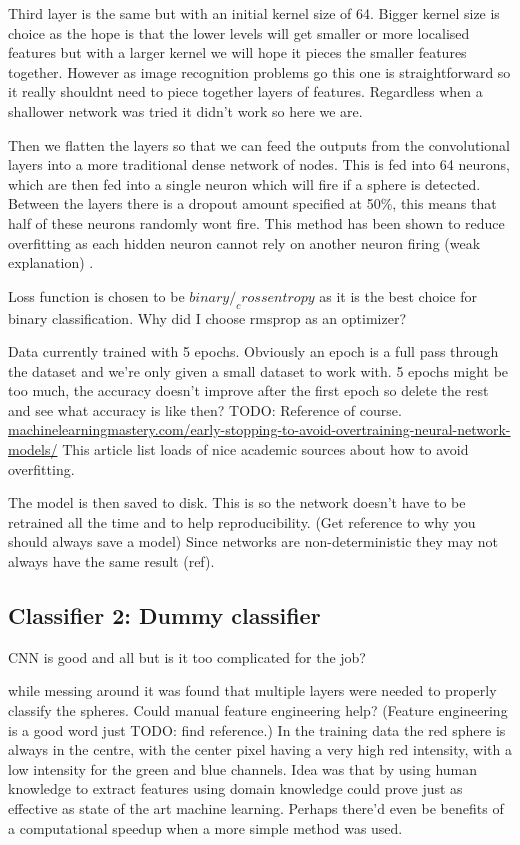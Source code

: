\documentclass{article}
\begin{document}
Third layer is the same but with an initial kernel size of 64.
Bigger kernel size is choice as the hope is that the lower levels will get smaller or more localised features but with a larger kernel we will hope it pieces the smaller features together.
However as image recognition problems go this one is straightforward so it really shouldnt need to piece together layers of features.
Regardless when a shallower network was tried it didn't work so here we are.  


Then we flatten the layers so that we can feed the outputs from the convolutional layers into a more traditional dense network of nodes.
This is fed into 64 neurons, which are then fed into a single neuron which will fire if a sphere is detected.
Between the layers there is a dropout amount specified at 50\%, this means that half of these neurons randomly wont fire.
This method has been shown to reduce overfitting as each hidden neuron cannot rely on another neuron firing (weak explanation) \cite{hinton2012improving}.

Loss function is chosen to be $binary/_crossentropy$ as it is the best choice for binary classification.
Why did I choose rmsprop as an optimizer? 

Data currently trained with 5 epochs.
Obviously an epoch is a full pass through the dataset and we're only given a small dataset to work with.
5 epochs might be too much, the accuracy doesn't improve after the first epoch so delete the rest and see what accuracy is like then?
TODO: Reference of course.
\url{machinelearningmastery.com/early-stopping-to-avoid-overtraining-neural-network-models/}
This article list loads of nice academic sources about how to avoid overfitting.

The model is then saved to disk.
This is so the network doesn't have to be retrained all the time and to help reproducibility.
(Get reference to why you should always save a model)
Since networks are non-deterministic they may not always have the same result (ref).

\subsection{Classifier 2: Dummy classifier}
CNN is good and all but is it too complicated for the job?

while messing around it was found that multiple layers were needed to properly classify the spheres.
Could manual feature engineering help? (Feature engineering is a good word just TODO: find reference.)
In the training data the red sphere is always in the centre, with the center pixel having a very high red intensity, with a low intensity for the green and blue channels. 
Idea was that by using human knowledge to extract features using domain knowledge could prove just as effective as state of the art machine learning.
Perhaps there'd even be benefits of a computational speedup when a more simple method was used.
\end{document}
